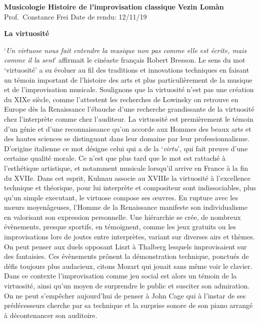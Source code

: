 \documentclass[12pt, letterpaper, twoside]{article}
\date{\vspace{-5ex}}
\begin{document}
\thispagestyle{fancy}
\noindent
\textbf{Musicologie Histoire de l’improvisation classique} \hfill \textbf{Vezin Lom\`an} \\
\normalsize Prof.\ Constance Frei \hfill Date de rendu: 12/11/19
\begin{center}
\textbf{La virtuosité}\\
\end{center}
\begin{spacing}{1.5}

`\emph{Un virtuose nous fait entendre la musique non pas comme elle est écrite, mais comme il la sent}' affirmait le cinéaste français Robert Bresson. Le sens du mot `virtuosité' a su évoluer au fil des traditions et innovations techniques en faisant un témoin important de l'histoire des arts et plus particulièrement de la musique et de l'improvisation musicale. 
Soulignons que la virtuosité n'est pas une création du XIXe siècle, comme l'attestent les recherches de Lowinsky on retrouve en Europe dès la Renaissance l'ébauche d'une recherche grandissante de la virtuosité chez l'interprète comme chez l'auditeur.
La virtuosité est premièrement le témoin d'un génie et d'une reconnaissance qu'on accorde aux Hommes des beaux arts et des hautes sciences se distinguant dans leur domaine par leur professionnalisme. D'origine italienne ce mot désigne celui qui a de la `\emph{virtu}', qui fait preuve d'une certaine qualité morale. Ce n'est que plus tard que le mot est rattaché à l'esthétique artistique, et notamment musicale lorsqu'il arrive en France à la fin du XVIIe. 
Dans cet esprit, Kuhnau associe au XVIIIe la virtuosité à l'excellence technique et théorique, pour lui interprète et compositeur sont indissociables, plus qu'un simple executant, le virtuose compose ses \oe{}uvres.
En rupture avec les m\oe{}urs moyenâgeuses, l'Homme de la Renaissance manifeste son individualisme en valorisant son expression personnelle. Une hiérarchie se crée, de nombreux évènements, presque sportifs, en témoignent, comme les jeux gratuits ou les improvisations lors de joutes entre interprètes, variant sur diverses airs et thèmes. On peut penser aux duels opposant Liszt à Thalberg lesquels improvisaient sur des fantaisies. Ces évènements prônent la démonstration technique, ponctués de défis toujours plus audacieux, citons Mozart qui jouait sans même voir le clavier. Dans ce contexte l'improvisation comme jeu social est alors un témoin de la virtuosité, ainsi qu'un moyen de surprendre le public et susciter son admiration. On ne peut s'empêcher aujourd'hui de penser à John Cage qui à l'instar de ses prédécesseurs cherche par sa technique et la surprise sonore de son piano arrangé à décontenancer son auditoire. 

\end{spacing}
\end{document}
